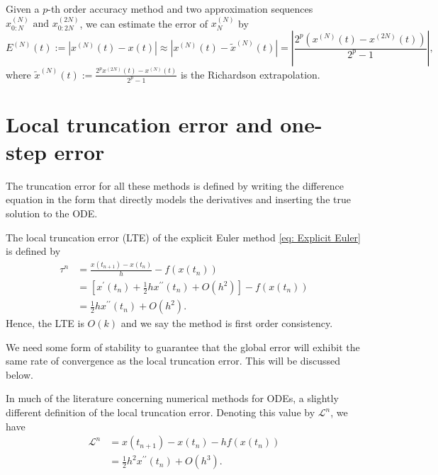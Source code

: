 \begin{theorem}
    \label{thm: Error estimation}
    Given a $ p $-th order accuracy method and two approximation sequences  $x_{0: N}^{(N)} \text { and } x_{0: 2N}^{\left(2N\right)}$, we can estimate the error of $ x_{N}^{(N)} $ by 
    \[
        E^{(N)}(t):=\left|x^{(N)}(t)-x(t)\right|\approx\left|x^{(N)}(t)-\tilde{x}^{(N)}(t)\right|=\left|\frac{2^p\left(x^{(N)}(t)-x^{(2 N)}(t)\right)}{2^p-1}\right|,
    \]
    where $ \tilde{x}^{(N)}(t):=\frac{2^p x^{(2 N)}(t)-x^{(N)}(t)}{2^p-1} $ is the Richardson extrapolation. 
    \end{theorem}

\section{Local truncation error and one-step error} 
The truncation error for all these methods is defined by writing the difference equation in the form that directly models the derivatives and inserting the true solution to the ODE. 


\begin{example}
\label{eg: LTE of Explicit Euler }
The local truncation error (LTE) of the explicit Euler method \eqref{eq: Explicit Euler} is defined by 
\begin{align*}
    \tau ^{n} &= \frac{x(t_{n+1}) - x(t_{n})}{h} - f(x(t_{n})) \\ 
              &= \left[ x^\prime (t_n) + \frac{1}{2} h x^{\prime \prime}(t_n) +O(h^{2} )  \right] - f(x(t_{n}))\\ 
              & = \frac{1}{2}h  x^{\prime \prime}(t_n) +O(h^{2}). 
\end{align*}
Hence, the LTE is $ O(k) $ and we say the method is first order consistency. 
\end{example}


We need some form of stability to guarantee that the global error will exhibit the same rate of convergence as the local truncation error. This will be discussed below.

In much of the literature concerning numerical methods for ODEs, a slightly different definition of the local truncation error. Denoting this value by $\mathcal{L}^n$, we have
$$
\begin{aligned}
\mathcal{L}^n & =x\left(t_{n+1}\right)-x\left(t_{n}\right)-h f\left(x\left(t_n\right)\right) \\
& =\frac{1}{2}h^2  x^{\prime \prime}(t_n) +O(h^{3}). 
\end{aligned}
$$


